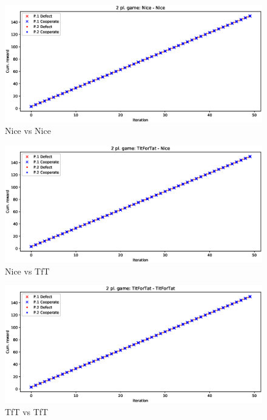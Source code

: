 \documentclass[journal,a4paper,10pt,twoside,draft=false]{IEEEtran}
\begin{document}
\begin{figure}[ht]
    \centering
    \includegraphics[width=1\columnwidth]{../img/ipd2p/ipd2p-rewards-Nice-Nice}
    \caption{Nice vs Nice}
    \label{fig:nicevsnice}
\end{figure}

\begin{figure}[ht]
    \centering
    \includegraphics[width=1\columnwidth]{../img/ipd2p/ipd2p-rewards-TitForTat-Nice}
    \caption{Nice vs TfT}
    \label{fig:nicevstft}
\end{figure}

\begin{figure}[ht]
    \centering
    \includegraphics[width=1\columnwidth]{../img/ipd2p/ipd2p-rewards-TitForTat-TitForTat}
    \caption{TfT vs TfT}
    \label{fig:tftvstft}
\end{figure}
\end{document}
